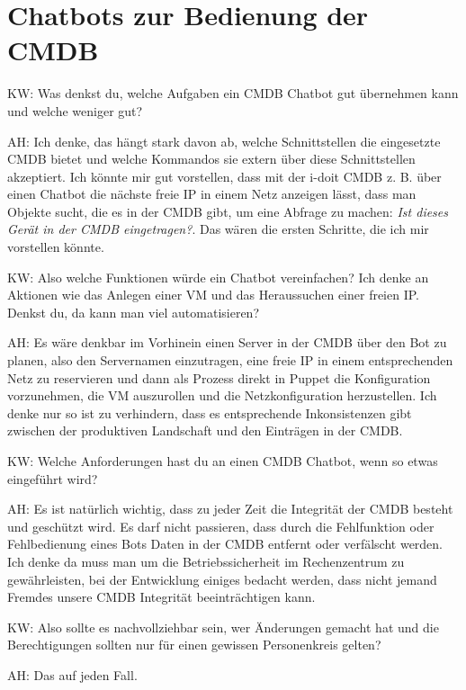 \section*{Chatbots zur Bedienung der CMDB}

\begin{list}{X:}{\setlength{\labelsep}{5mm}}
\item [KW:] Was denkst du, welche Aufgaben ein CMDB Chatbot gut übernehmen kann und welche weniger gut?
\item [AH:] Ich denke, das hängt stark davon ab, welche Schnittstellen die eingesetzte CMDB bietet und welche Kommandos sie extern über diese Schnittstellen akzeptiert. Ich könnte mir gut vorstellen, dass mit der i-doit CMDB z. B. über einen Chatbot die nächste freie IP in einem Netz anzeigen lässt, dass man Objekte sucht, die es in der CMDB gibt,  um eine Abfrage zu machen: \textit{Ist dieses Gerät in der CMDB eingetragen?}. Das wären die ersten Schritte, die ich mir vorstellen könnte.
\item [KW:] Also welche Funktionen würde ein Chatbot vereinfachen? Ich denke an Aktionen wie das Anlegen einer VM und das Heraussuchen einer freien IP. Denkst du, da kann man viel automatisieren?
\item [AH:] Es wäre denkbar im Vorhinein einen Server in der CMDB über den Bot zu planen, also den Servernamen einzutragen, eine freie IP in einem entsprechenden Netz zu reservieren und dann als Prozess direkt in Puppet die Konfiguration vorzunehmen, die VM auszurollen und die Netzkonfiguration herzustellen. Ich denke nur so ist zu verhindern, dass es entsprechende Inkonsistenzen gibt zwischen der produktiven Landschaft und den Einträgen in der CMDB.
\item [KW:] Welche Anforderungen hast du an einen CMDB Chatbot, wenn so etwas eingeführt wird?
\item [AH:] Es ist natürlich wichtig, dass zu jeder Zeit die Integrität der CMDB besteht und geschützt wird. Es darf nicht passieren, dass durch die Fehlfunktion oder Fehlbedienung eines Bots Daten in der CMDB entfernt oder verfälscht werden. Ich denke da muss man um die Betriebssicherheit im Rechenzentrum zu gewährleisten, bei der Entwicklung einiges bedacht werden, dass nicht jemand Fremdes unsere CMDB Integrität beeinträchtigen kann.
\item [KW:] Also sollte es nachvollziehbar sein, wer Änderungen gemacht hat und die Berechtigungen sollten nur für einen gewissen Personenkreis gelten?
\item [AH:] Das auf jeden Fall.

\end{list}
